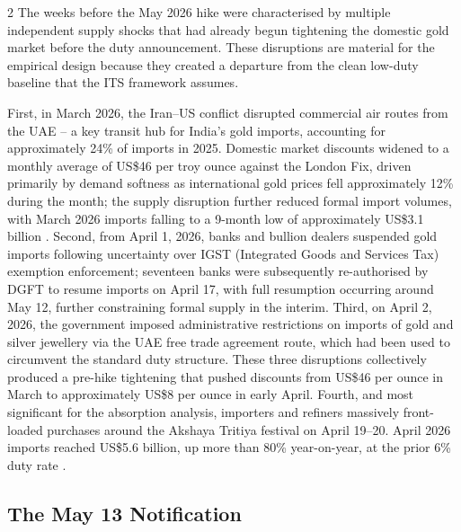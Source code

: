 \documentclass[12pt]{article}
\begin{document}
\begin{multicols}{2}
The weeks before the May 2026 hike were characterised by multiple independent supply shocks that had already begun tightening the domestic gold market before the duty announcement. These disruptions are material for the empirical design because they created a departure from the clean low-duty baseline that the ITS framework assumes.

First, in March 2026, the Iran--US conflict disrupted commercial air routes from the UAE -- a key transit hub for India's gold imports, accounting for approximately 24\% of imports in 2025. Domestic market discounts widened to a monthly average of US\$46 per troy ounce against the London Fix, driven primarily by demand softness as international gold prices fell approximately 12\% during the month; the supply disruption further reduced formal import volumes, with March 2026 imports falling to a 9-month low of approximately US\$3.1 billion \citep{WGC2026Apr}. Second, from April 1, 2026, banks and bullion dealers suspended gold imports following uncertainty over IGST (Integrated Goods and Services Tax) exemption enforcement; seventeen banks were subsequently re-authorised by DGFT to resume imports on April 17, with full resumption occurring around May 12, further constraining formal supply in the interim. Third, on April 2, 2026, the government imposed administrative restrictions on imports of gold and silver jewellery via the UAE free trade agreement route, which had been used to circumvent the standard duty structure. These three disruptions collectively produced a pre-hike tightening that pushed discounts from US\$46 per ounce in March to approximately US\$8 per ounce in early April. Fourth, and most significant for the absorption analysis, importers and refiners massively front-loaded purchases around the Akshaya Tritiya festival on April 19--20. April 2026 imports reached US\$5.6 billion, up more than 80\% year-on-year, at the prior 6\% duty rate \citep{WGC2026May}.

\subsection*{The May 13 Notification}


\end{multicols}
\end{document}
